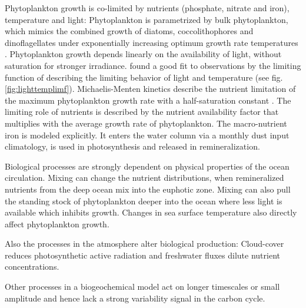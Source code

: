Phytoplankton growth is co-limited by nutrients (phosphate, nitrate and iron), temperature and light: Phytoplankton is parametrized by bulk phytoplankton, which mimics the combined growth of diatoms, coccolithophores and dinoflagellates under exponentially increasing optimum growth rate temperatures \citep{Eppley1972}. 
Phytoplankton growth depends linearly on the availability of light, without saturation for stronger irradiance. \cite{PlattJassby1976} found a good fit to observations by the limiting function of \cite{Smith1936} describing the limiting behavior of light and temperature \citep{Six1996} (see fig. \ref{fig:lighttemplimf}). 
Michaelis-Menten kinetics describe the nutrient limitation of the maximum phytoplankton growth rate with a half-saturation constant \citep{MichaelisMenten1913}. The limiting role of nutrients is described by the nutrient availability factor that multiplies with the average growth rate of phytoplankton. 
The macro-nutrient iron is modeled explicitly. It enters the water column via a monthly dust input climatology, is used in photosynthesis and released in remineralization.\newline



Biological processes are strongly dependent on physical properties of the ocean circulation. Mixing can change the nutrient distributions, when remineralized nutrients from the deep ocean mix into the euphotic zone. Mixing can also pull the standing stock of phytoplankton deeper into the ocean where less light is available which inhibits growth. Changes in sea surface temperature also directly affect phytoplankton growth. 

Also the processes in the atmosphere alter biological production: Cloud-cover reduces photosynthetic active radiation and freshwater fluxes dilute nutrient concentrations.\newline

Other processes in a biogeochemical model act on longer timescales or small amplitude and hence lack a strong variability signal in the carbon cycle. 

